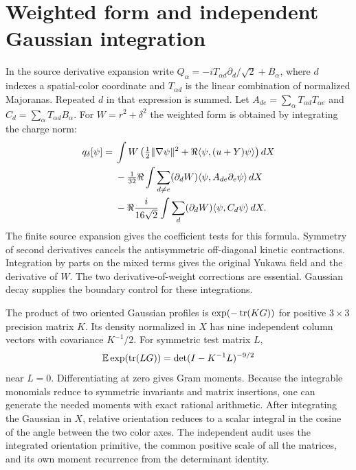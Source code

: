 \section{Weighted form and independent Gaussian integration}
In the source derivative expansion write $Q_\alpha=-iT_{\alpha d}\partial_d/\sqrt2+B_\alpha$, where $d$ indexes a spatial-color coordinate and $T_{\alpha d}$ is the linear combination of normalized Majoranas. Repeated $d$ in that expression is summed. Let $A_{de}=\sum_\alpha T_{\alpha d}T_{\alpha e}$ and $C_d=\sum_\alpha T_{\alpha d}B_\alpha$. For $W=r^2+\delta^2$ the weighted form is obtained by integrating the charge norm:
\begin{align*}
 q_\delta[\psi]={}&\int W\left(\tfrac12\lVert \nabla\psi\rVert^2+
                        \Re\langle \psi,(u+Y)\psi\rangle\right)dX\\
 &-\tfrac1{32}\Re\int\sum_{d\ne e}(\partial_d W)
                      \langle \psi,A_{de}\partial_e\psi\rangle\,dX\\
 &-\Re\frac{i}{16\sqrt2}\int\sum_d(\partial_d W)
                   \langle \psi,C_d\psi\rangle\,dX .
\end{align*}
The finite source expansion gives the coefficient tests for this formula. Symmetry of second derivatives cancels the antisymmetric off-diagonal kinetic contractions. Integration by parts on the mixed terms gives the original Yukawa field and the derivative of $W$. The two derivative-of-weight corrections are essential. Gaussian decay supplies the boundary control for these integrations.

The product of two oriented Gaussian profiles is $\exp(-\operatorname{tr}(KG))$ for positive $3\times3$ precision matrix $K$. Its density normalized in $X$ has nine independent column vectors with covariance $K^{-1}/2$. For symmetric test matrix $L$,
\[
 \mathbb E \exp(\operatorname{tr}(LG))=\det(I-K^{-1}L)^{-9/2}
\]
near $L=0$. Differentiating at zero gives Gram moments. Because the integrable monomials reduce to symmetric invariants and matrix insertions, one can generate the needed moments with exact rational arithmetic. After integrating the Gaussian in $X$, relative orientation reduces to a scalar integral in the cosine of the angle between the two color axes. The independent audit uses the integrated orientation primitive, the common positive scale of all the matrices, and its own moment recurrence from the determinant identity.

